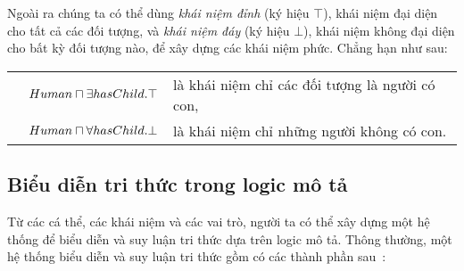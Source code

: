 \begin{Example}
	Ngoài ra chúng ta có thể dùng {\em khái niệm đỉnh} (ký hiệu $\top$), khái niệm đại diện cho tất cả các đối tượng, và {\em khái niệm đáy} (ký hiệu $\bot$), khái niệm không đại diện cho bất kỳ đối tượng nào, để xây dựng các khái niệm phức. Chẳng hạn như sau:\\[1.0ex]
	\begin{tabular}{c l l}
		& $Human \sqcap \exists hasChild.\top$ & là khái niệm chỉ các đối tượng là người có con,\\[0.5ex]
		& $Human \sqcap \forall hasChild.\bot$ & là khái niệm chỉ những người không có con.\hspace{2.03cm}\myend
	\end{tabular}
\end{Example}

\subsection{Biểu diễn tri thức trong logic mô tả}
\label{sec:Chap1.KnowledgeRepresentation}

Từ các cá thể, các khái niệm và các vai trò, người ta có thể xây dựng một hệ thống để biểu diễn và suy luận tri thức dựa trên logic mô tả. Thông thường, một hệ thống biểu diễn và suy luận tri thức gồm có các thành phần sau~\cite{DLHandbook2007}:

